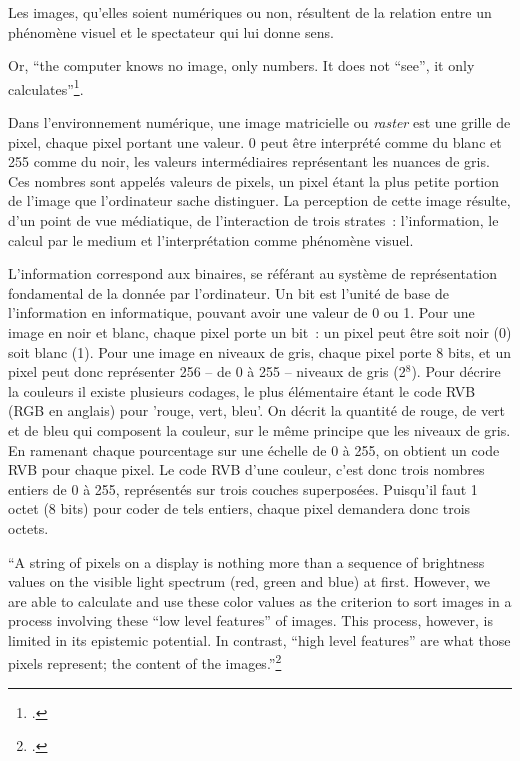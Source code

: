 Les images, qu'elles soient numériques ou non, résultent de la relation
entre un phénomène visuel et le spectateur qui lui donne sens.

Or, \enquote{the computer knows no image, only numbers. It does not ``see'', it
only calculates}\footcite[p.21]{klinke_big_2016}.

Dans l'environnement numérique, une image matricielle ou \textit{raster} est une
grille de pixel, chaque pixel portant une valeur. 0 peut être interprété
comme du blanc et 255 comme du noir, les valeurs intermédiaires
représentant les nuances de gris. Ces nombres sont appelés valeurs de
pixels, un pixel étant la plus petite portion de l'image que
l'ordinateur sache distinguer. La perception de cette image résulte,
d'un point de vue médiatique, de l'interaction de trois strates~:
l'information, le calcul par le medium et l'interprétation comme
phénomène visuel.

L'information correspond aux binaires, se référant au système de
représentation fondamental de la donnée par l'ordinateur. Un bit est
l'unité de base de l'information en informatique, pouvant avoir une
valeur de 0 ou 1. Pour une image en noir et blanc, chaque pixel porte un
bit~: un pixel peut être soit noir (0) soit blanc (1). Pour une image en
niveaux de gris, chaque pixel porte 8 bits, et un pixel peut donc
représenter 256 -- de 0 à 255 -- niveaux de gris (2$^8$). Pour décrire la
couleurs il existe plusieurs codages, le plus élémentaire étant le code
RVB (RGB en anglais) pour 'rouge, vert, bleu'. On décrit la quantité
de rouge, de vert et de bleu qui composent la couleur, sur le même
principe que les niveaux de gris. En ramenant chaque pourcentage sur une
échelle de 0 à 255, on obtient un code RVB pour chaque pixel. Le code
RVB d'une couleur, c'est donc trois nombres entiers de 0 à 255,
représentés sur trois couches superposées. Puisqu'il faut 1 octet (8
bits) pour coder de tels entiers, chaque pixel demandera donc trois
octets.

\begin{kwote}                     
``A string of pixels on a display is nothing more than a sequence of
brightness values on the visible light spectrum (red, green and blue) at
first. However, we are able to calculate and use these color values as
the criterion to sort images in a process involving these ``low level
features'' of images. This process, however, is limited in its epistemic
potential. In contrast, ``high level features'' are what those pixels
represent; the content of the images.''\footcite[p.17]{klinke_big_2016}
                 \end{kwote}     

